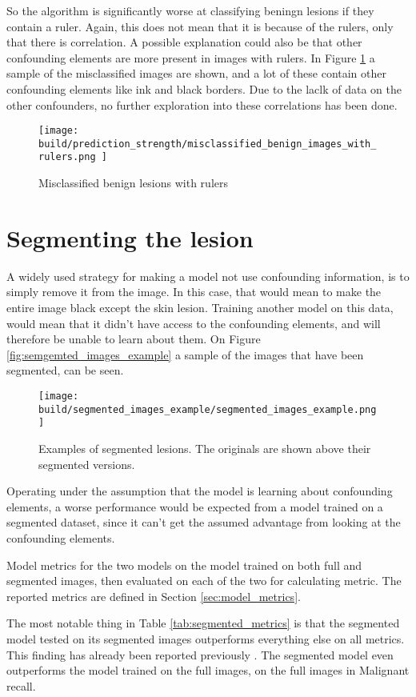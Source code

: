 So the algorithm is significantly worse at classifying beningn lesions if they contain a ruler.
Again, this does not mean that it is because of the rulers, only that there is correlation.
A possible explanation could also be that other confounding elements are more present in images with rulers.
In Figure \ref{fig:prediction_strength_ruler_misclassified_benign} a sample of the misclassified images are shown,
and a lot of these contain other confounding elements like ink and black borders.
Due to the laclk of data on the other confounders, no further exploration into these correlations has been done.

\begin{figure}
    \centering
    \texttt{[image: 
        build/prediction\_strength/misclassified\_benign\_images\_with\_rulers.png
    ]}
    \caption{Misclassified benign lesions with rulers}
    \label{fig:prediction_strength_ruler_misclassified_benign}
\end{figure}

\section{Segmenting the lesion}
A widely used strategy for making a model not use confounding information, is to simply remove it from the image.
In this case, that would mean to make the entire image black except the skin lesion.
Training another model on this data, would mean that it didn't have access to the confounding elements, 
and will therefore be unable to learn about them.
On Figure \ref{fig:semgemted_images_example} a sample of the images that have been segmented,
can be seen.

\begin{figure}[h]
    \centering
    \texttt{[image: 
        build/segmented\_images\_example/segmented\_images\_example.png
    ]}
    \caption{Examples of segmented lesions. The originals are shown above their segmented versions.}
    \label{fig:segmented_images_example}
\end{figure}

Operating under the assumption that the model is learning about confounding elements,
a worse performance would be expected from a model trained on a segmented dataset,
since it can't get the assumed advantage from looking at the confounding elements.

\begin{table}
    
    \caption{Model metrics for the two models on the model trained on both full and segmented images,
                then evaluated on each of the two for calculating metric.
                The reported metrics are defined in Section \ref{sec:model_metrics}.
    }
    \label{tab:segmented_metrics}
\end{table}

The most notable thing in Table \ref{tab:segmented_metrics} is that the segmented model tested
on its segmented images outperforms everything else on all metrics.
This finding has already been reported previously \cite{segmenting-improves-performance}.
The segmented model even outperforms the model trained on the full images, on the full images in Malignant recall.
